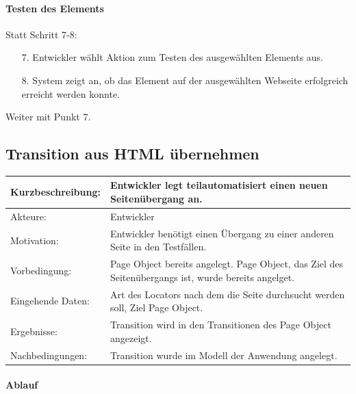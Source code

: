 \paragraph{Testen des Elements}
Statt Schritt 7-8:
\begin{itemize}
\item[7.] Entwickler wählt Aktion zum Testen des ausgewählten Elements aus. 
\item[8.] System zeigt an, ob das Element auf der ausgewählten Webseite erfolgreich erreicht werden konnte. 
\end{itemize}
Weiter mit Punkt 7. 

\subsection{Transition aus HTML übernehmen}
\label{sec:Transition_from_html}

\begin{tabular}[h]{|p{4cm}|p{}|}
\hline 
\rule[-1ex]{0pt}{2.5ex}Kurzbeschreibung: & 
Entwickler legt teilautomatisiert einen neuen Seitenübergang an. \\  
\hline 
\rule[-1ex]{0pt}{2.5ex}Akteure: & 
Entwickler \\ 
\hline 
\rule[-1ex]{0pt}{2.5ex}Motivation: & 
Entwickler benötigt einen Übergang zu einer anderen Seite in den Testfällen. \\ 
\hline 
\rule[-1ex]{0pt}{2.5ex}Vorbedingung: & 
Page Object bereits angelegt. Page Object, das Ziel des Seitenübergangs ist, wurde bereits angelget. \\ 
\hline 
\rule[-1ex]{0pt}{2.5ex}Eingehende Daten: & Art des Locators nach dem die Seite durchsucht werden soll, Ziel Page Object. \\ 
\hline 
\rule[-1ex]{0pt}{2.5ex}Ergebnisse: & Transition wird in den Transitionen des Page Object angezeigt. \\ 
\hline 
\rule[-1ex]{0pt}{2.5ex}Nachbedingungen: & Transition wurde im Modell der Anwendung angelegt.  \\ 
\hline 
\end{tabular} 

\paragraph{Ablauf}

